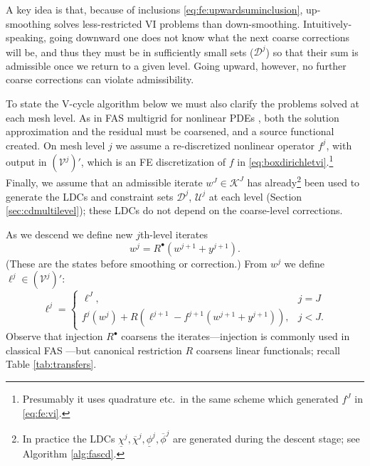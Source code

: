 \documentclass[letterpaper,final,12pt,reqno]{amsart}
\theoremstyle{cstyle}
\theoremstyle{cstyle*}
\theoremstyle{dstyle}
\numberwithin{equation}{section}
\numberwithin{figure}{section}
\numberwithin{table}{section}
\numberwithin{theorem}{section}
\newcommand{\cV}{\mathcal{V}}
\newcommand{\iR}{R^{\bullet}}
\begin{document}
A key idea is that, because of inclusions \eqref{eq:fe:upwardsuminclusion}, up-smoothing solves less-restricted VI problems than down-smoothing.  Intuitively-speaking, going downward one does not know what the next coarse corrections will be, and thus they must be in sufficiently small sets ($\mathcal{D}^j$) so that their sum is admissible once we return to a given level.  Going upward, however, no further coarse corrections can violate admissibility.

To state the V-cycle algorithm below we must also clarify the problems solved at each mesh level.  As in FAS multigrid for nonlinear PDEs \cite{BrandtLivne2011,Bruneetal2015,Trottenbergetal2001}, both the solution approximation and the residual must be coarsened, and a source functional created.  On mesh level $j$ we assume a re-discretized nonlinear operator $f^j$, with output in $(\cV^j)'$, which is an FE discretization of $f$ in \eqref{eq:boxdirichletvi}.\footnote{Presumably it uses quadrature etc.~in the same scheme which generated $f^J$ in \eqref{eq:fe:vi}.}  Finally, we assume that an admissible iterate $w^J \in \mathcal{K}^J$ has already\footnote{In practice the LDCs $\underline{\chi}^j,\overline{\chi}^j,\underline{\phi}^j,\overline{\phi}^j$ are generated during the descent stage; see Algorithm \ref{alg:fascd}.} been used to generate the LDCs and constraint sets $\mathcal{D}^j$, $\mathcal{U}^j$ at each level (Section \ref{sec:cdmultilevel}); these LDCs do not depend on the coarse-level corrections.

As we descend we define new $j$th-level iterates
\begin{equation}
w^j = \iR(w^{j+1} + y^{j+1}).  \label{eq:fe:definew}
\end{equation}
(These are the states before smoothing or correction.)  From $w^j$ we define $\ell^j \in (\cV^j)'$:
\begin{equation}
\ell^j = \begin{cases} \ell^J, & j=J \\
                       f^j(w^j) + R\left(\ell^{j+1}-f^{j+1}(w^{j+1}+y^{j+1})\right), & j<J. \end{cases} \label{eq:fe:levelsource}
\end{equation}
Observe that injection $\iR$ coarsens the iterates---injection is commonly used in classical FAS \cite[section 5.3]{Trottenbergetal2001}---but canonical restriction $R$ coarsens linear functionals; recall Table \ref{tab:transfers}.
\end{document}
